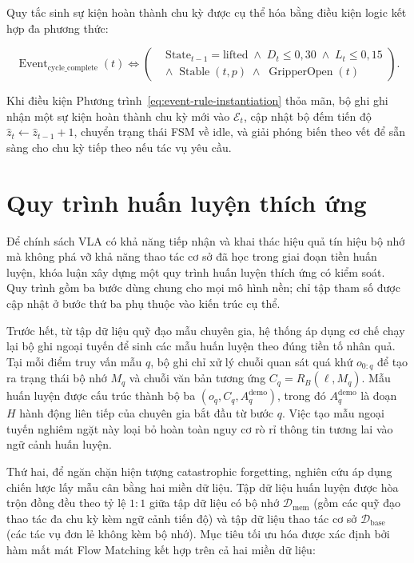 Quy tắc sinh sự kiện hoàn thành chu kỳ được cụ thể hóa bằng điều kiện logic kết hợp đa phương thức:

\begin{equation}
\operatorname{Event}_{\mathrm{cycle\_complete}}(t) \iff
\left(
\begin{aligned}
&\text{State}_{t-1} = \text{lifted} \;\land\; D_t \le 0{,}30 \;\land\; L_t \le 0{,}15 \\
&\land\; \operatorname{Stable}(t, p) \;\land\; \operatorname{GripperOpen}(t)
\end{aligned}
\right).
\label{eq:event-rule-instantiation}
\end{equation}

Khi điều kiện Phương trình~\eqref{eq:event-rule-instantiation} thỏa mãn, bộ ghi ghi nhận một sự kiện hoàn thành chu kỳ mới vào $\mathcal E_t$, cập nhật bộ đếm tiến độ $\hat z_t \leftarrow \hat z_{t-1} + 1$, chuyển trạng thái FSM về $\text{idle}$, và giải phóng biến theo vết để sẵn sàng cho chu kỳ tiếp theo nếu tác vụ yêu cầu.

\section{Quy trình huấn luyện thích ứng}
\label{sec:adaptation}

Để chính sách VLA có khả năng tiếp nhận và khai thác hiệu quả tín hiệu bộ nhớ mà không phá vỡ khả năng thao tác cơ sở đã học trong giai đoạn tiền huấn luyện, khóa luận xây dựng một quy trình huấn luyện thích ứng có kiểm soát. Quy trình gồm ba bước dùng chung cho mọi mô hình nền; chỉ tập tham số được cập nhật ở bước thứ ba phụ thuộc vào kiến trúc cụ thể.

Trước hết, từ tập dữ liệu quỹ đạo mẫu chuyên gia, hệ thống áp dụng cơ chế chạy lại bộ ghi ngoại tuyến để sinh các mẫu huấn luyện theo đúng tiền tố nhân quả. Tại mỗi điểm truy vấn mẫu $q$, bộ ghi chỉ xử lý chuỗi quan sát quá khứ $o_{0:q}$ để tạo ra trạng thái bộ nhớ $M_q$ và chuỗi văn bản tương ứng $C_q = R_B(\ell, M_q)$. Mẫu huấn luyện được cấu trúc thành bộ ba $(o_q, C_q, A_q^{\mathrm{demo}})$, trong đó $A_q^{\mathrm{demo}}$ là đoạn $H$ hành động liên tiếp của chuyên gia bắt đầu từ bước $q$. Việc tạo mẫu ngoại tuyến nghiêm ngặt này loại bỏ hoàn toàn nguy cơ rò rỉ thông tin tương lai vào ngữ cảnh huấn luyện.

Thứ hai, để ngăn chặn hiện tượng catastrophic forgetting, nghiên cứu áp dụng chiến lược lấy mẫu cân bằng hai miền dữ liệu. Tập dữ liệu huấn luyện được hòa trộn đồng đều theo tỷ lệ $1:1$ giữa tập dữ liệu có bộ nhớ $\mathcal D_{\mathrm{mem}}$ (gồm các quỹ đạo thao tác đa chu kỳ kèm ngữ cảnh tiến độ) và tập dữ liệu thao tác cơ sở $\mathcal D_{\mathrm{base}}$ (các tác vụ đơn lẻ không kèm bộ nhớ). Mục tiêu tối ưu hóa được xác định bởi hàm mất mát Flow Matching kết hợp trên cả hai miền dữ liệu:

